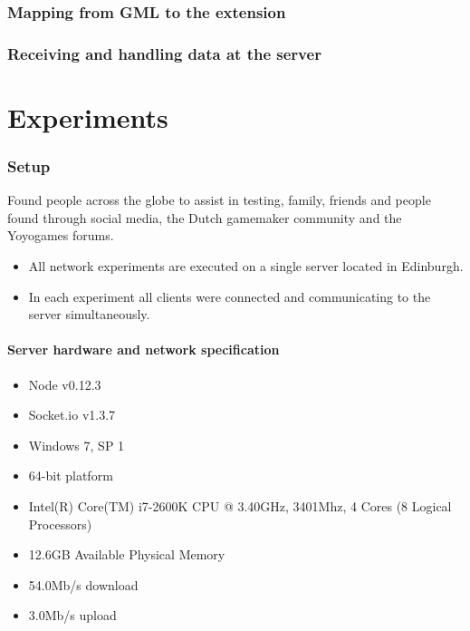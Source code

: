 \documentclass[12pt]{article}
\begin{document}
\section{Mapping from GML to the extension}

\section{Receiving and handling data at the server}


\pagebreak
\part{Experiments}
\pagebreak

\section{Setup}
Found people across the globe to assist in testing, family, friends and people found through social media, the Dutch gamemaker community and the Yoyogames forums.
\begin{itemize}
\item All network experiments are executed on a single server located in Edinburgh.
\item In each experiment all clients were connected and communicating to the server simultaneously.
\end{itemize}
\subsection{Server hardware and network specification}
\begin{itemize}
\item Node v0.12.3
\item Socket.io v1.3.7

\item Windows 7, SP 1
\item 64-bit platform
\item Intel(R) Core(TM) i7-2600K CPU @ 3.40GHz, 3401Mhz, 4 Cores (8 Logical Processors)
\item 12.6GB Available Physical Memory

\item 54.0Mb/s download
\item 3.0Mb/s upload
\end{itemize}
\end{document}
